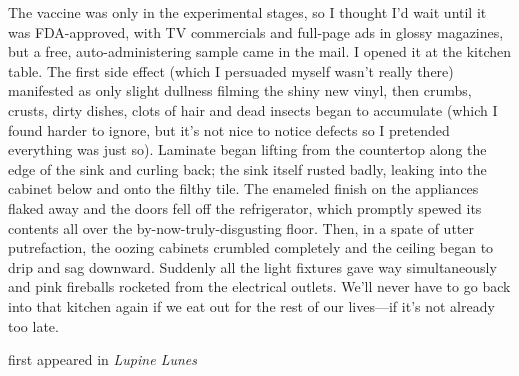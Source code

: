The vaccine was only in the experimental stages, so I thought I'd wait
until it was FDA-approved, with TV commercials and full-page ads in
glossy magazines, but a free, auto-administering sample came in the
mail. I opened it at the kitchen table. The first side effect (which I
persuaded myself wasn't really there) manifested as only slight dullness
filming the shiny new vinyl, then crumbs, crusts, dirty dishes, clots of
hair and dead insects began to accumulate (which I found harder to
ignore, but it's not nice to notice defects so I pretended everything
was just so). Laminate began lifting from the countertop along the edge
of the sink and curling back; the sink itself rusted badly, leaking into
the cabinet below and onto the filthy tile. The enameled finish on the
appliances flaked away and the doors fell off the refrigerator, which
promptly spewed its contents all over the by-now-truly-disgusting floor.
Then, in a spate of utter putrefaction, the oozing cabinets crumbled
completely and the ceiling began to drip and sag downward. Suddenly all
the light fixtures gave way simultaneously and pink fireballs rocketed
from the electrical outlets. We'll never have to go back into that
kitchen again if we eat out for the rest of our lives---if it's not
already too late.

first appeared in \emph{Lupine Lunes}
